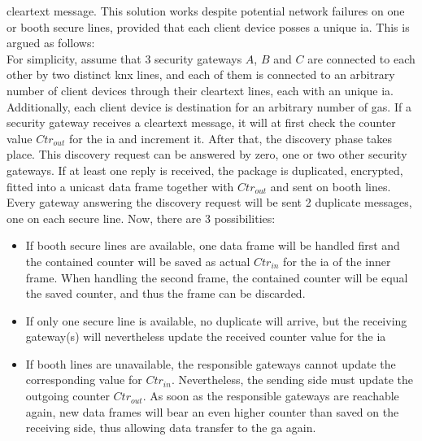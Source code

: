 cleartext message. This solution works despite potential network failures on one or booth secure lines, provided that each client device posses a unique
\gls{ia}. This is argued as follows:
\\
For simplicity, assume that 3 security gateways $A$, $B$ and $C$ are connected to each other by two distinct \gls{knx} lines, and each of them is connected
to an arbitrary number of client devices through their cleartext lines, each with an unique \gls{ia}.
Additionally, each client device is destination for an arbitrary number of \glspl{ga}.
If a security gateway receives a cleartext message, it will at first check the counter value $Ctr_{out}$ for the \gls{ia} and increment it. After that, the 
discovery phase takes place. This discovery request can be answered by zero, one or two other security gateways. If at least one reply is received, the package
is duplicated, encrypted, fitted into a unicast data frame together with $Ctr_{out}$ and sent on booth lines.
\\
Every gateway answering the discovery request will be sent 2 duplicate messages, one on each secure line. Now, there are 3 possibilities:
\begin{itemize}
 \item If booth secure lines are available, one data frame will be handled first and the contained counter will be saved as actual $Ctr_{in}$ for the \gls{ia}
 of the inner frame. When handling the second frame, the contained counter will be equal the saved counter, and thus the frame can be discarded.
 \item If only one secure line is available, no duplicate will arrive, but the receiving gateway(s) will nevertheless update the received counter value for the
 \gls{ia}
 \item If booth lines are unavailable, the responsible gateways cannot update the corresponding value for $Ctr_{in}$. Nevertheless, the sending side must update
 the outgoing counter $Ctr_{out}$. As soon as the responsible gateways are reachable again, new data frames will bear an even higher counter than saved on the
 receiving side, thus allowing data transfer to the \gls{ga} again.
\end{itemize}



